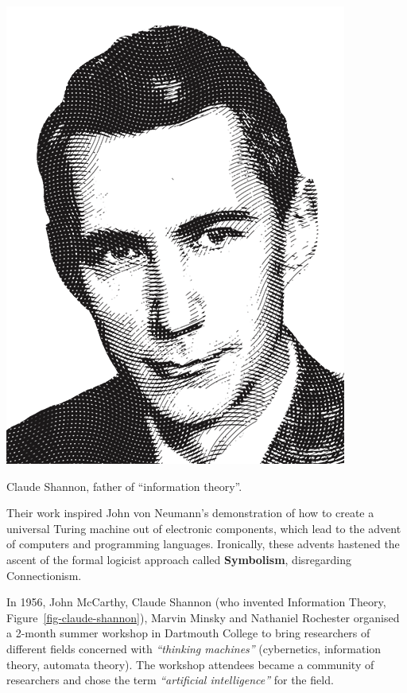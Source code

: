 \documentclass[
  letterpaper,
  12pt,
  british]{tufte-book}
\theoremstyle{plain}
\theoremstyle{plain}
\theoremstyle{definition}
\theoremstyle{remark}
\begin{document}
\hypertarget{fig-claude-shannon}{}
\begin{marginfigure}

\includegraphics{Images/shannon.png}

\label{fig-claude-shannon}Claude Shannon, father of ``information
theory''.

\end{marginfigure}

Their work inspired John von Neumann's demonstration of how to create a
universal Turing machine out of electronic components, which lead to the
advent of computers and programming languages. Ironically, these advents
hastened the ascent of the formal logicist approach called
\textbf{Symbolism}, disregarding Connectionism.

In 1956, John McCarthy, Claude Shannon (who invented Information Theory,
Figure~\ref{fig-claude-shannon}), Marvin Minsky and Nathaniel Rochester
organised a 2-month summer workshop in Dartmouth College to bring
researchers of different fields concerned with \emph{``thinking
machines''} (cybernetics, information theory, automata theory). The
workshop attendees became a community of researchers and chose the term
\emph{``artificial intelligence''} for the field.
\end{document}
